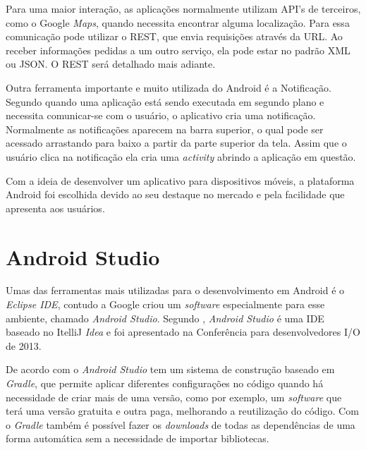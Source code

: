 	\par Para uma maior interação, as aplicações normalmente utilizam API’s de
terceiros, como o Google \textit{Maps}, quando necessita encontrar alguma
localização. Para  essa comunicação pode utilizar o
REST, que envia requisições através da URL. Ao receber informações pedidas a um
outro serviço, ela pode estar no padrão XML ou JSON. O REST será detalhado mais
adiante.

	\par Outra ferramenta importante e muito utilizada do Android é a Notificação.
Segundo  quando uma aplicação está sendo executada em
segundo plano e necessita comunicar-se com o usuário, o aplicativo cria uma
notificação. Normalmente as notificações aparecem na barra superior, o qual
pode ser acessado arrastando para baixo a partir da parte superior da tela.
Assim que o usuário clica na notificação ela cria uma \textit{activity} abrindo
a aplicação em questão.

	\par Com a ideia de desenvolver um aplicativo para dispositivos móveis, a
plataforma Android foi escolhida devido ao seu destaque no mercado e pela
facilidade que apresenta aos usuários.

\section{Android Studio}

	\par Umas das ferramentas mais utilizadas para o desenvolvimento em Android é o
\textit{Eclipse IDE}, contudo a Google criou um \textit{software} especialmente
para esse ambiente, chamado \textit{Android Studio}. Segundo
, \textit{Android Studio} é uma IDE baseado no ItelliJ
\textit{Idea} e foi apresentado na Conferência para desenvolvedores I/O de 2013.

	\par De acordo com  o \textit{Android Studio} tem um
sistema de construção baseado em \textit{Gradle}, que permite aplicar
diferentes configurações no código quando há necessidade de criar mais de uma
versão, como por exemplo, um \textit{software} que terá uma versão gratuita e
outra paga, melhorando a reutilização do código. Com o \textit{Gradle} também é
possível fazer os \textit{downloads} de todas as dependências de uma forma
automática sem a necessidade de importar bibliotecas.

